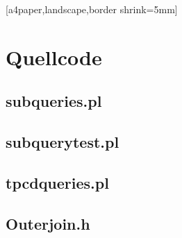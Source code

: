 %
% 
%
\label{Anhang}


%
%
%

\newpage

[a4paper,landscape,border shrink=5mm]
  \chapter{Quellcode}
  \section{subqueries.pl}
  
  \newpage
  \section{subquerytest.pl}
  
  \newpage
  \section{tpcdqueries.pl}
  
  \newpage
  \section{Outerjoin.h}
  
%  

%

%
%
%